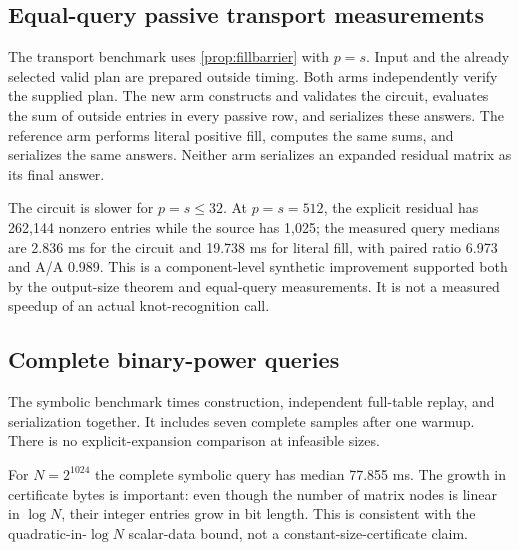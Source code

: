 \documentclass[11pt,letterpaper]{article}
\theoremstyle{definition}
\theoremstyle{remark}
\begin{document}
\subsection{Equal-query passive transport measurements}
The transport benchmark uses \cref{prop:fillbarrier} with $p=s$. Input and the already selected valid plan are prepared outside timing. Both arms independently verify the supplied plan. The new arm constructs and validates the circuit, evaluates the sum of outside entries in every passive row, and serializes these answers. The reference arm performs literal positive fill, computes the same sums, and serializes the same answers. Neither arm serializes an expanded residual matrix as its final answer.
\begin{table}[htbp]
\centering

\caption{The same complete passive-row sum query, via a shared circuit or explicit positive fill. Reference/new ratios include construction, checking, evaluation, and answer serialization.}
\label{tab:transport}
\end{table}

The circuit is slower for $p=s\le32$. At $p=s=512$, the explicit residual has 262,144 nonzero entries while the source has 1,025; the measured query medians are 2.836 ms for the circuit and 19.738 ms for literal fill, with paired ratio 6.973 and A/A 0.989. This is a component-level synthetic improvement supported both by the output-size theorem and equal-query measurements. It is not a measured speedup of an actual knot-recognition call.

\subsection{Complete binary-power queries}
The symbolic benchmark times construction, independent full-table replay, and serialization together. It includes seven complete samples after one warmup. There is no explicit-expansion comparison at infeasible sizes.
\begin{table}[htbp]
\centering

\caption{Binary cycles with $2N$ edges. All arithmetic and proof data are exact. Serialized bytes exclude the final newline used in the saved audit packet.}
\label{tab:power}
\end{table}

For $N=2^{1024}$ the complete symbolic query has median 77.855 ms. The growth in certificate bytes is important: even though the number of matrix nodes is linear in $\log N$, their integer entries grow in bit length. This is consistent with the quadratic-in-$\log N$ scalar-data bound, not a constant-size-certificate claim.
\end{document}
